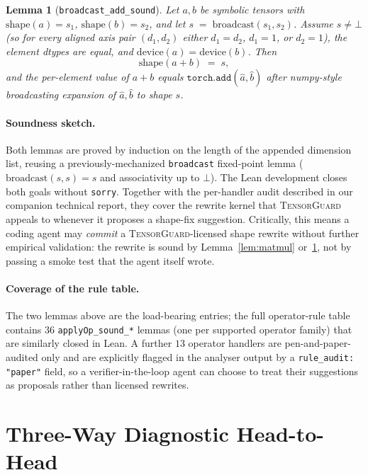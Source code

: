 \documentclass{article}
\newtheorem{lemma}{Lemma}
\begin{document}
\begin{lemma}[\texttt{broadcast\_add\_sound}]\label{lem:bcast}
Let $a, b$ be symbolic tensors with $\mathrm{shape}(a)=s_1$,
$\mathrm{shape}(b)=s_2$, and let
$s \;=\; \mathrm{broadcast}(s_1,s_2)$.
Assume $s \neq \bot$ (so for every aligned axis pair $(d_1,d_2)$
either $d_1=d_2$, $d_1=1$, or $d_2=1$), the element dtypes are equal,
and $\mathrm{device}(a)=\mathrm{device}(b)$. Then
\[
  \mathrm{shape}(a + b) \;=\; s,
\]
and the per-element value of $a+b$ equals
$\mathtt{torch.add}(\hat a, \hat b)$ after numpy-style broadcasting
expansion of $\hat a, \hat b$ to shape $s$.
\end{lemma}

\paragraph{Soundness sketch.} Both lemmas are proved by induction on the
length of the appended dimension list, reusing a previously-mechanized
\texttt{broadcast} fixed-point lemma
($\mathrm{broadcast}(s,s)=s$ and associativity up to $\bot$). The Lean
development closes both goals without \texttt{sorry}. Together with the
per-handler audit described in our companion technical report, they
cover the rewrite kernel that \textsc{TensorGuard} appeals to whenever
it proposes a shape-fix suggestion. Critically, this means a coding
agent may \emph{commit} a \textsc{TensorGuard}-licensed shape rewrite
without further empirical validation: the rewrite is sound by
Lemma~\ref{lem:matmul} or~\ref{lem:bcast}, not by passing a smoke
test that the agent itself wrote.

\paragraph{Coverage of the rule table.} The two lemmas above are the
load-bearing entries; the full operator-rule table contains $36$
\texttt{applyOp\_sound\_*} lemmas (one per supported operator family)
that are similarly closed in Lean. A further $13$ operator handlers
are pen-and-paper-audited only and are explicitly flagged in the
analyser output by a \texttt{rule\_audit: "paper"} field, so a
verifier-in-the-loop agent can choose to treat their suggestions as
proposals rather than licensed rewrites.

\section{Three-Way Diagnostic Head-to-Head}
\label{sec:headtohead}
\end{document}
